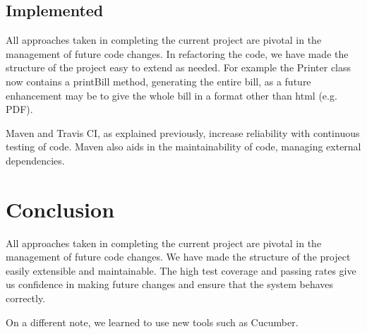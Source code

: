 \documentclass[a4paper]{article}
\begin{document}
\subsection{Implemented}

All approaches taken in completing the current project are pivotal in the management
of future code changes. In refactoring the code, we have made the structure of
the project easy to extend as needed. For example the Printer class now contains
a printBill method, generating the entire bill, as a future enhancement may be to
give the whole bill in a format other than html (e.g. PDF).

Maven and Travis CI, as explained previously, increase reliability with continuous
testing of code. Maven also aids in the maintainability of code, managing external
dependencies.

\section{Conclusion}

All approaches taken in completing the current project are pivotal in the management of future code changes. We have made the structure of the project easily extensible and maintainable. The high test coverage and passing rates give us confidence in making future changes and ensure that the system behaves correctly. 

On a different note, we learned to use new tools such as Cucumber.
\end{document}
